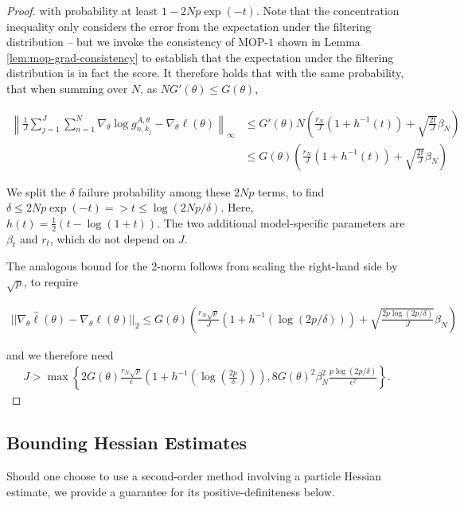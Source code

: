 \documentclass{article}
\begin{document}
\begin{proof}
with probability at least $1-2Np\exp(-t)$. Note that the concentration inequality only considers the error from the expectation under the filtering distribution -- but we invoke the consistency of MOP-$1$ shown in Lemma \ref{lem:mop-grad-consistency} to establish that the expectation under the filtering distribution is in fact the score. It therefore holds that with the same probability, that when summing over $N$, as $NG'(\theta) \leq G(\theta)$, 

\begin{align}
    \left\lVert\frac{1}{J}\sum_{j=1}^J\sum_{n=1}^N\nabla_\theta \log g_{n,k_j}^{A,\theta} - \nabla_\theta \ell(\theta) \right\rVert_{\infty} 
    &\leq G'(\theta)N\left(\frac{r_N}{J}(1+h^{-1}(t)) + \sqrt{\frac{2t}{J}}\beta_N \right)\\
    &\leq G(\theta)\left(\frac{r_N}{J}(1+h^{-1}(t)) + \sqrt{\frac{2t}{J}}\beta_N \right)
\end{align}


We split the $\delta$ failure probability among these $2Np$ terms, to find $\delta\leq2Np\exp(-t) => t\leq\log(2Np/\delta)$. Here, $h(t) = \frac{1}{2}(t - \log(1+t))$. The two additional model-specific parameters are $\beta_t$ and $r_t$, which do not depend on $J$. 

The analogous bound for the 2-norm follows from scaling the right-hand side by $\sqrt{p}$, to require 

\begin{align}
    ||\nabla_\theta \hat\ell(\theta) - \nabla_\theta \ell(\theta)||_2 \leq G(\theta)\left(\frac{r_N\sqrt{p}}{J}(1+h^{-1}(\log(2p/\delta))) + \sqrt{\frac{2p\log(2p/\delta)}{J}}\beta_N\right)
\end{align}

and we therefore need 
\begin{align}
    J > \max\left\{2G(\theta)\frac{r_N\sqrt{p}}{\epsilon}\left(1+h^{-1}\left(\log\left(\frac{2p}{\delta}\right)\right)\right), 8G(\theta)^2\beta_N^2\frac{p\log(2p/\delta)}{\epsilon^2}\right\}.
\end{align}

\end{proof}


\subsection{Bounding Hessian Estimates}

Should one choose to use a second-order method involving a particle Hessian estimate, we provide a guarantee for its positive-definiteness below.
\end{document}
